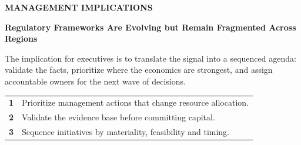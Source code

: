 \documentclass[10pt,a4paper]{article}
\begin{document}
\clearpage
{\textcolor{BOBlue}{\scriptsize\bfseries MANAGEMENT IMPLICATIONS}}\par\vspace{-1pt}
{\Large\sffamily\bfseries\color{BONavy} Regulatory Frameworks Are Evolving but Remain Fragmented Across Regions}\par\vspace{4pt}
{\small The implication for executives is to translate the signal into a sequenced agenda: validate the facts, prioritize where the economics are strongest, and assign accountable owners for the next wave of decisions.}\par
\begin{tabularx}{\linewidth}{p{10mm}Y}
\textcolor{BOBlue}{\bfseries 1} & Prioritize management actions that change resource allocation. \\[5pt]
\textcolor{BOBlue}{\bfseries 2} & Validate the evidence base before committing capital. \\[5pt]
\textcolor{BOBlue}{\bfseries 3} & Sequence initiatives by materiality, feasibility and timing. \\[5pt]
\end{tabularx}
\vspace{6pt}

\vspace{6pt}{\textcolor{BOBlue}{\scriptsize\bfseries EXECUTION ROADMAP}}\par
\begin{center}
\end{center}
\end{document}
